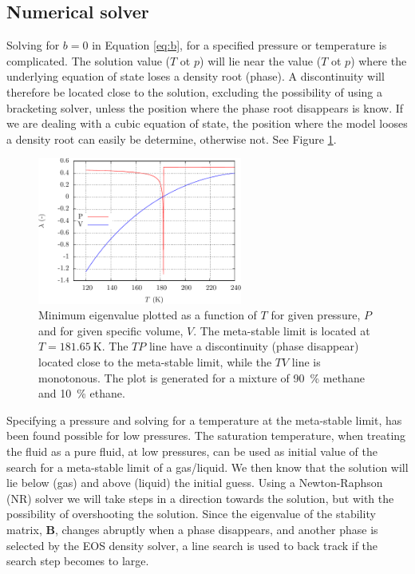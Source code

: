 \documentclass[internal,english]{sintefmemo2012}
\newcommand*{\vektor}[1]{\boldsymbol{#1}}%
\begin{document}
\subsection{Numerical solver}
Solving for $b = 0$ in Equation \ref{eq:b}, for a specified pressure
or temperature is complicated. The solution value ($T$ ot $p$) will
lie near the value ($T$ ot $p$) where the underlying equation of state
loses a density root (phase). A discontinuity will therefore be
located close to the solution, excluding the possibility of using a
bracketing solver, unless the position where the phase root disappears
is know. If we are dealing with a cubic equation of state, the
position where the model looses a density root can easily be
determine, otherwise not. See Figure \ref{fig:meta_init}.
\begin{figure}[h]
  \centering
  \includegraphics[width=0.6\textwidth]{meta_init}
  \caption{Minimum eigenvalue plotted as a function of $T$ for given
    pressure, $P$ and for given specific volume, $V$. The
    meta-stable limit is located at $T=\SI{181.65}{\kelvin}$. The $TP$
    line have a discontinuity (phase disappear) located close to the
    meta-stable limit, while the $TV$ line is monotonous. The plot is
    generated for a mixture of \SI{90}{\percent} methane and
    \SI{10}{\percent} ethane.}
  \label{fig:meta_init}
\end{figure}

Specifying a pressure and solving for a temperature at the meta-stable
limit, has been found possible for low pressures. The saturation
temperature, when treating the fluid as a pure fluid, at low
pressures, can be used as initial value of the search for a
meta-stable limit of a gas/liquid. We then know that the solution will
lie below (gas) and above (liquid) the initial guess. Using a
Newton-Raphson (NR) solver we will take steps in a direction towards
the solution, but with the possibility of overshooting the
solution. Since the eigenvalue of the stability matrix, $\vektor{B}$,
changes abruptly when a phase disappears, and another phase is selected
by the EOS density solver, a line search is used to back track if the
search step becomes to large.
\end{document}
